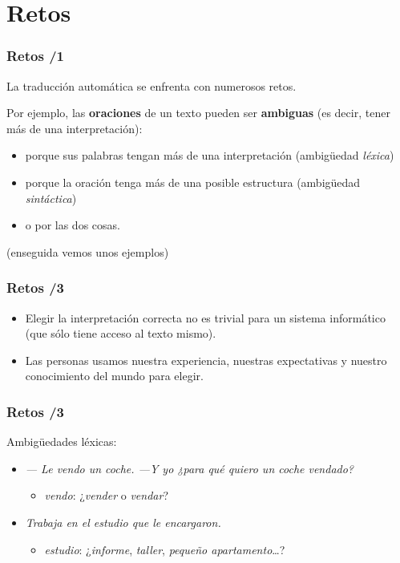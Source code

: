 \documentclass{beamer}
\newcommand{\empha}[1]{\emph{#1}\/}
\begin{document}
\section{Retos}
\begin{frame}
\frametitle{Retos /1}

La traducción automática se enfrenta con numerosos retos.


Por ejemplo, las \textbf{oraciones} de un texto pueden ser
\textbf{ambiguas} (es decir, tener más de una interpretación):

\begin{itemize}
\item porque sus palabras tengan más de una interpretación (ambigüedad
  \empha{léxica})


\item porque la oración tenga más de una posible estructura  (ambigüedad \empha{sintáctica})

\item o por las dos cosas.
\end{itemize}
(enseguida vemos unos ejemplos)
\end{frame}

\begin{frame}
\frametitle{Retos /3}
\begin{itemize}
\item Elegir la interpretación correcta no es trivial para un sistema
informático (que sólo tiene acceso al texto mismo).

\item Las personas usamos nuestra experiencia, nuestras expectativas y nuestro conocimiento del mundo para elegir.

\end{itemize}



\end{frame} 

\begin{frame}
  \frametitle{Retos /3}
  Ambigüedades léxicas:
  \begin{itemize}
  \item \emph{--- Le vendo un coche. ---Y yo ¿para qué quiero un coche vendado?}
    \begin{itemize}
    \item \emph{vendo}: ¿\emph{vender} o \emph{vendar}?
    \end{itemize}
  \item \emph{Trabaja en el estudio que le encargaron.}
    \begin{itemize}
    \item \emph{estudio}: ¿\emph{informe}, \emph{taller}, \emph{pequeño apartamento}\ldots?
    \end{itemize}
  \end{itemize}
\end{frame}
\end{document}
